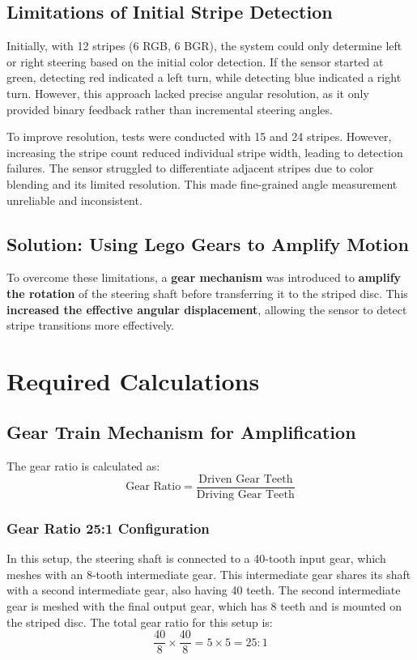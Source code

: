 \subsection{Limitations of Initial Stripe Detection}
Initially, with 12 stripes (6 RGB, 6 BGR), the system could only determine left or right steering based on the initial color detection. If the sensor started at green, detecting red indicated a left turn, while detecting blue indicated a right turn. However, this approach lacked precise angular resolution, as it only provided binary feedback rather than incremental steering angles.

To improve resolution, tests were conducted with 15 and 24 stripes. However, increasing the stripe count reduced individual stripe width, leading to detection failures. The sensor struggled to differentiate adjacent stripes due to color blending and its limited resolution. This made fine-grained angle measurement unreliable and inconsistent.





\subsection{Solution: Using Lego Gears to Amplify Motion}
To overcome these limitations, a \textbf{gear mechanism} was introduced to \textbf{amplify the rotation} of the steering shaft before transferring it to the striped disc. This \textbf{increased the effective angular displacement}, allowing the sensor to detect stripe transitions more effectively.





\section{Required Calculations}

\subsection{Gear Train Mechanism for Amplification}


The gear ratio is calculated as:
\[
\text{Gear Ratio} = \frac{\text{Driven Gear Teeth}}{\text{Driving Gear Teeth}}
\]

\subsubsection{Gear Ratio 25:1 Configuration }
In this setup, the steering shaft is connected to a 40-tooth input gear, which meshes with an 8-tooth intermediate gear. This intermediate gear shares its shaft with a second intermediate gear, also having 40 teeth. The second intermediate gear is meshed with the final output gear, which has 8 teeth and is mounted on the striped disc. The total gear ratio for this setup is:
\[
\frac{40}{8} \times \frac{40}{8} = 5 \times 5 = 25:1
\]

